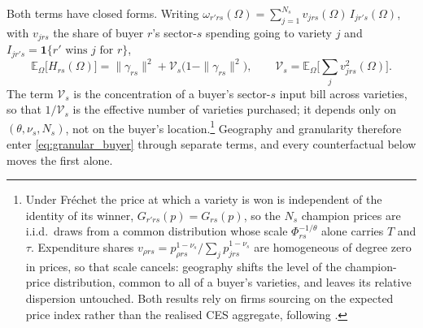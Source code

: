 Both terms have closed forms. Writing $\omega_{r'rs}(\Omega)=\sum_{j=1}^{N_{s}}v_{jrs}(\Omega)\,I_{jr's}(\Omega)$, with $v_{jrs}$ the share of buyer $r$'s sector-$s$ spending going to variety $j$ and $I_{jr's}=\mathbf 1\{r'\text{ wins }j\text{ for }r\}$,
\begin{equation}
\mathbb{E}_{\Omega}\big[H_{rs}(\Omega)\big]=\|\gamma_{rs}\|^{2}+\mathcal{V}_{s}\big(1-\|\gamma_{rs}\|^{2}\big),
\qquad
\mathcal{V}_{s}=\mathbb{E}_{\Omega}\Big[\textstyle\sum_{j}v_{jrs}^{2}(\Omega)\Big].
\label{eq:granular_buyer}
\end{equation}
The term $\mathcal{V}_{s}$ is the concentration of a buyer's sector-$s$ input bill across varieties, so that $1/\mathcal{V}_{s}$ is the effective number of varieties purchased; it depends only on $(\theta,\nu_{s},N_{s})$, not on the buyer's location.\footnote{Under Fr\'echet the price at which a variety is won is independent of the identity of its winner, $G_{r'rs}(p)=G_{rs}(p)$, so the $N_{s}$ champion prices are i.i.d.\ draws from a common distribution whose scale $\Phi_{rs}^{-1/\theta}$ alone carries $T$ and $\tau$. Expenditure shares $v_{\rho rs}=p_{\rho rs}^{1-\nu_{s}}/\sum_{j}p_{jrs}^{1-\nu_{s}}$ are homogeneous of degree zero in prices, so that scale cancels: geography shifts the level of the champion-price distribution, common to all of a buyer's varieties, and leaves its relative dispersion untouched. Both results rely on firms sourcing on the expected price index rather than the realised CES aggregate, following \citet{lenoir2023search}.} Geography and granularity therefore enter \eqref{eq:granular_buyer} through separate terms, and every counterfactual below moves the first alone.

